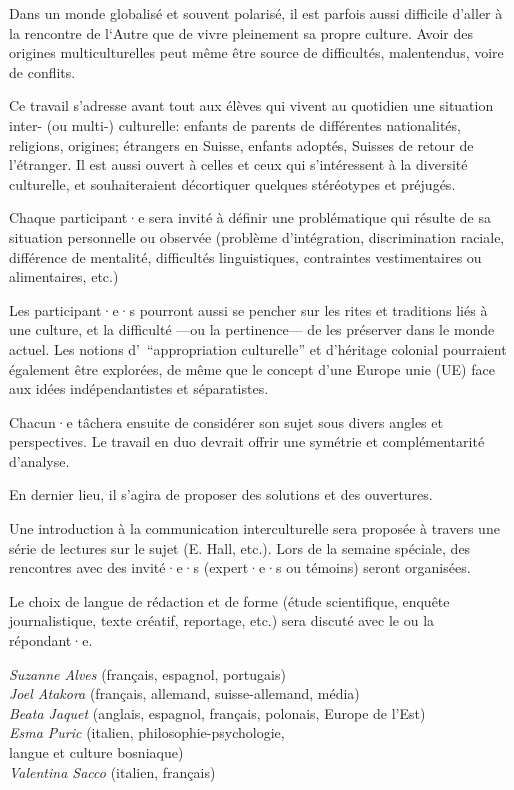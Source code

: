 \documentclass[
  10pt,
  french,
  a5paper,
  openany]{book}
\newenvironment{signature}{\begin{flushright}}{\end{flushright}}
\begin{document}
Dans un monde globalisé et souvent polarisé, il est parfois aussi difficile d'aller à la rencontre de l`Autre que de vivre pleinement sa propre culture. Avoir des origines multiculturelles peut même être source de difficultés, malentendus, voire de conflits.

Ce travail s'adresse avant tout aux élèves qui vivent au quotidien une situation inter- (ou multi-) culturelle: enfants de parents de différentes nationalités, religions, origines; étrangers en Suisse, enfants adoptés, Suisses de retour de l'étranger.
Il est aussi ouvert à celles et ceux qui s'intéressent à la diversité culturelle, et souhaiteraient décortiquer quelques stéréotypes et préjugés.

Chaque participant·e sera invité à définir une problématique qui résulte de sa situation personnelle ou observée (problème d'intégration, discrimination raciale, différence de mentalité, difficultés linguistiques, contraintes vestimentaires ou alimentaires, etc.)

Les participant·e·s pourront aussi se pencher sur les rites et traditions liés à une culture, et la difficulté ---ou la pertinence--- de les préserver dans le monde actuel. Les notions d'~``appropriation culturelle'' et d'héritage colonial pourraient également être explorées, de même que le concept d'une Europe unie (UE) face aux idées indépendantistes et séparatistes.

Chacun·e tâchera ensuite de considérer son sujet sous divers angles et perspectives. Le travail en duo devrait offrir une symétrie et complémentarité d'analyse.

En dernier lieu, il s'agira de proposer des solutions et des ouvertures.

Une introduction à la communication interculturelle sera proposée à travers une série de lectures sur le sujet (E. Hall, etc.). Lors de la semaine spéciale, des rencontres avec des invité·e·s (expert·e·s ou témoins) seront organisées.

Le choix de langue de rédaction et de forme (étude scientifique, enquête journalistique, texte créatif, reportage, etc.) sera discuté avec le ou la répondant·e.

\begin{signature}
\emph{Suzanne Alves} (français, espagnol, portugais)\\
\emph{Joel Atakora} (français, allemand, suisse-allemand, média)\\
\emph{Beata Jaquet} (anglais, espagnol, français, polonais, Europe de l'Est)\\
\emph{Esma Puric} (italien, philosophie-psychologie,\\
langue et culture bosniaque)\\
\emph{Valentina Sacco} (italien, français)

\end{signature}
\end{document}
